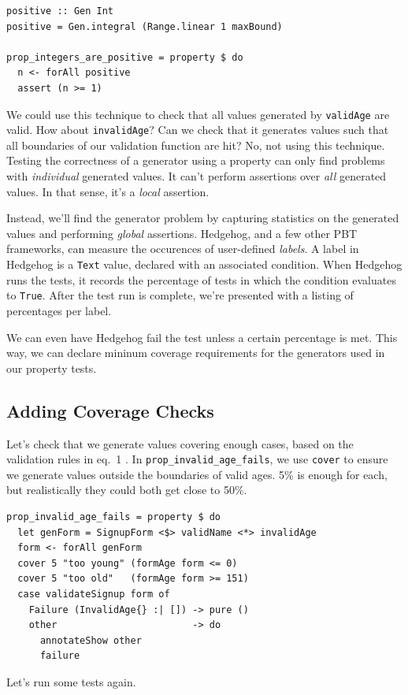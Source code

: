 \begin{verbatim}
positive :: Gen Int
positive = Gen.integral (Range.linear 1 maxBound)

prop_integers_are_positive = property $ do
  n <- forAll positive
  assert (n >= 1)
\end{verbatim}
We could use this technique to check that all values generated by
\texttt{validAge} are valid. How about \texttt{invalidAge}? Can we check
that it generates values such that all boundaries of our validation
function are hit? No, not using this technique. Testing the correctness
of a generator using a property can only find problems with
\emph{individual} generated values. It can't perform assertions over
\emph{all} generated values. In that sense, it's a \emph{local}
assertion.

Instead, we'll find the generator problem by capturing statistics on the
generated values and performing \emph{global} assertions. Hedgehog, and
a few other PBT frameworks, can measure the occurences of user-defined
\emph{labels}. A label in Hedgehog is a \texttt{Text} value, declared
with an associated condition. When Hedgehog runs the tests, it records
the percentage of tests in which the condition evaluates to
\texttt{True}. After the test run is complete, we're presented with a
listing of percentages per label.

We can even have Hedgehog fail the test unless a certain percentage is
met. This way, we can declare mininum coverage requirements for the
generators used in our property tests.

\subsection{Adding Coverage Checks}\label{adding-coverage-checks}

Let's check that we generate values covering enough cases, based on the
validation rules in eq.~1 . In \texttt{prop\_invalid\_age\_fails}, we
use \texttt{cover} to ensure we generate values outside the boundaries
of valid ages. 5\% is enough for each, but realistically they could both
get close to 50\%.

\begin{verbatim}
prop_invalid_age_fails = property $ do
  let genForm = SignupForm <$> validName <*> invalidAge
  form <- forAll genForm
  cover 5 "too young" (formAge form <= 0)
  cover 5 "too old"   (formAge form >= 151)
  case validateSignup form of
    Failure (InvalidAge{} :| []) -> pure ()
    other                        -> do
      annotateShow other
      failure
\end{verbatim}
Let's run some tests again.

